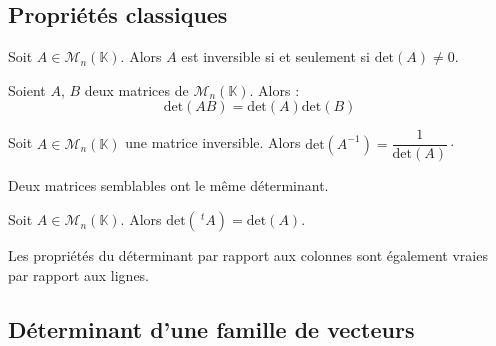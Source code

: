 \documentclass[a4paper,10pt]{report}
\begin{document}
\subsection{Propriétés classiques}

\begin{Proposition}{} Soit $A \in \mathcal{M}_n(\mathbb{K})$. Alors $A$ est inversible si et seulement si $\textrm{det}(A) \neq 0$.
\end{Proposition}

\begin{Proposition}{} Soient $A$, $B$ deux matrices de $\mathcal{M}_n(\mathbb{K})$. Alors :
$$ \textrm{det}(AB) = \textrm{det}(A) \textrm{det}(B)$$
\end{Proposition}

\begin{Corollaire}{} Soit $A \in \mathcal{M}_n(\mathbb{K})$ une matrice inversible. Alors $\textrm{det}(A^{-1}) = \dfrac{1}{\textrm{det}(A)}
\cdot$
\end{Corollaire}

\begin{Proposition}{} Deux matrices semblables ont le même déterminant.
\end{Proposition}

\begin{Demonstration}{} 
\vspace{4cm}
\end{Demonstration}

\begin{Proposition}{} Soit $A \in \mathcal{M}_n(\mathbb{K})$. Alors $\textrm{det}(~^tA) = \textrm{det}(A)$.
\end{Proposition}

\begin{Corollaire}{} Les propriétés du déterminant par rapport aux colonnes sont également vraies par rapport aux lignes.
\end{Corollaire}

\subsection{Déterminant d'une famille de vecteurs}
\end{document}
